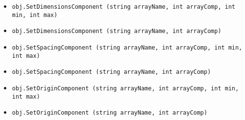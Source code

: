 \begin{itemize}
\item  \verb|obj.SetDimensionsComponent (string arrayName, int arrayComp, int min, int max)|

\item  \verb|obj.SetDimensionsComponent (string arrayName, int arrayComp)|

\item  \verb|obj.SetSpacingComponent (string arrayName, int arrayComp, int min, int max)|

\item  \verb|obj.SetSpacingComponent (string arrayName, int arrayComp)|

\item  \verb|obj.SetOriginComponent (string arrayName, int arrayComp, int min, int max)|

\item  \verb|obj.SetOriginComponent (string arrayName, int arrayComp)|

\end{itemize}
